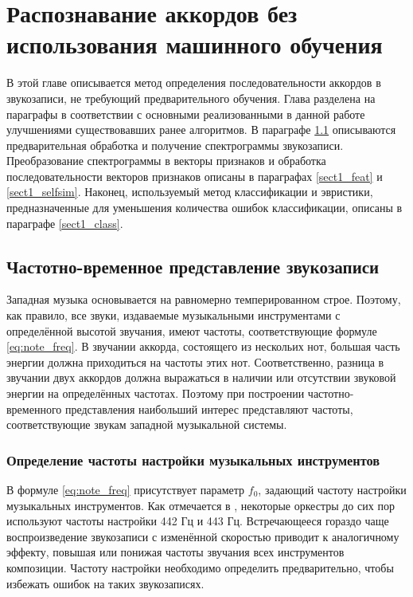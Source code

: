 \chapter{Распознавание аккордов без использования машинного обучения}
\label{chapt1}

В этой главе описывается метод определения последовательности аккордов в
звукозаписи, не требующий предварительного обучения. Глава разделена на
параграфы в соответствии с основными реализованными в данной работе улучшениями
существовавших ранее алгоритмов. В параграфе \ref{sect1_spectrogram} описываются
предварительная обработка и получение спектрограммы звукозаписи. Преобразование
спектрограммы в векторы признаков и обработка последовательности векторов
признаков описаны в параграфах \ref{sect1_feat} и \ref{sect1_selfsim}. Наконец,
используемый метод классификации и эвристики, предназначенные для уменьшения
количества ошибок классификации, описаны в параграфе \ref{sect1_class}.

\section{Частотно-временное представление звукозаписи} \label{sect1_spectrogram}

Западная музыка основывается на равномерно темперированном строе. Поэтому, как
правило, все звуки, издаваемые музыкальными инструментами с определённой высотой
звучания, имеют частоты, соответствующие формуле \ref{eq:note_freq}. В звучании
аккорда, состоящего из нескольих нот, большая часть энергии должна приходиться
на частоты этих нот. Соответственно, разница в звучании двух аккордов должна
выражаться в наличии или отсутствии звуковой энергии на определённых частотах.
Поэтому при построении частотно-временного представления наибольший интерес
представляют частоты, соответствующие звукам западной музыкальной системы. 

\subsection{Определение частоты настройки музыкальных инструментов}
\label{ssect1_f0}

В формуле \ref{eq:note_freq} присутствует параметр $f_0$, задающий частоту
настройки музыкальных инструментов. Как отмечается в \cite[с. 89]{Lerch2012},
некоторые оркестры до сих пор используют частоты настройки 442 Гц и 443 Гц.
Встречающееся гораздо чаще воспроизведение звукозаписи с изменённой скоростью
приводит к аналогичному эффекту, повышая или понижая частоты звучания всех
инструментов композиции. Частоту настройки необходимо определить предварительно,
чтобы избежать ошибок на таких звукозаписях.

